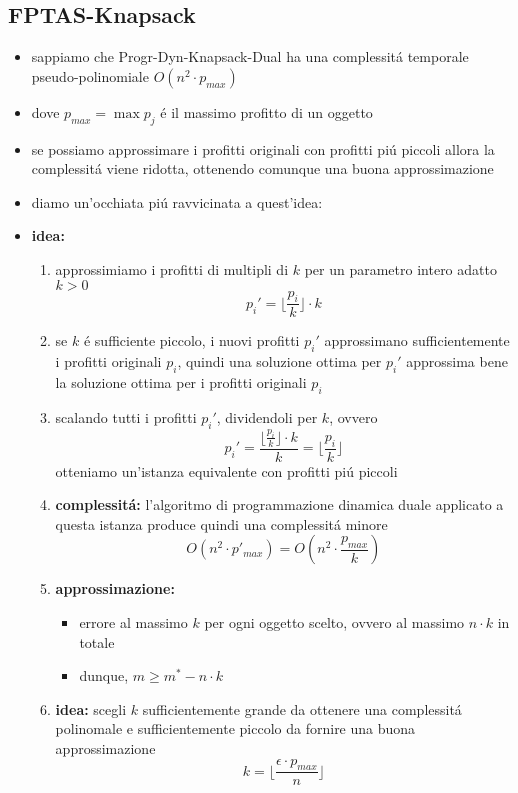 \subsection*{FPTAS-Knapsack}
\begin{flushleft}
	\begin{itemize}
		\item sappiamo che Progr-Dyn-Knapsack-Dual ha una complessit\'a temporale pseudo-polinomiale $O(n^2\cdot p_{max})$
		\item dove $p_{max}=\max p_j$ \'e il massimo profitto di un oggetto
		\item se possiamo approssimare i profitti originali con profitti pi\'u piccoli allora la complessit\'a viene ridotta, ottenendo comunque una buona approssimazione
		\item diamo un'occhiata pi\'u ravvicinata a quest'idea:
		\item \textbf{idea:}
		\begin{enumerate}
			\item approssimiamo i profitti di multipli di $k$ per un parametro intero adatto $k>0$
				$$p_i'=\lfloor\frac{p_i}{k}\rfloor\cdot k$$
			\item se $k$ \'e sufficiente piccolo, i nuovi profitti $p_i'$ approssimano sufficientemente i profitti originali $p_i$, quindi una soluzione ottima per $p_i'$ approssima bene la soluzione ottima per i profitti originali $p_i$
			\item scalando tutti i profitti $p_i'$, dividendoli per $k$, ovvero
				$$p_i'=\frac{\lfloor\frac{p_i}{k}\rfloor\cdot k}{k}=\lfloor\frac{p_i}{k}\rfloor$$
			otteniamo un'istanza equivalente con profitti pi\'u piccoli
			\item \textbf{complessit\'a:} l'algoritmo di programmazione dinamica duale applicato a questa istanza produce quindi una complessit\'a minore \newline \\
				$$O(n^2\cdot p'_{max})=O(n^2\cdot\frac{p_{max}}{k})$$
			\item \textbf{approssimazione:}
			\begin{itemize}
				\item errore al massimo $k$ per ogni oggetto scelto, ovvero al massimo $n\cdot k$ in totale
				\item dunque, $m\geq m^*-n\cdot k$
			\end{itemize}
			\item \textbf{idea:} scegli $k$ sufficientemente grande da ottenere una complessit\'a polinomale e sufficientemente piccolo da fornire una buona approssimazione
				$$k=\lfloor\frac{\epsilon\cdot p_{max}}{n}\rfloor$$
		\end{enumerate}
	\end{itemize}
\end{flushleft}

